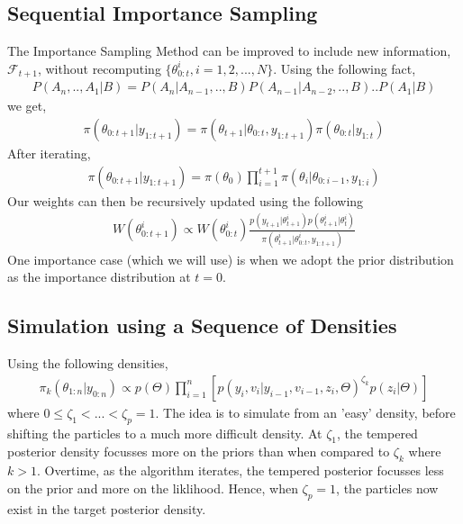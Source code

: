 \documentclass[11pt]{article}
\theoremstyle{definition}
\begin{document}
\subsection{Sequential Importance Sampling}
The Importance Sampling Method can be improved to include new information, $\mathcal{F}_{t+1}$, without recomputing $\{\theta_{0:t}^{i},i=1,2,...,N\}$. Using the following fact,
\begin{equation}
	\begin{aligned}
		P(A_{n},..,A_{1}|B) = P(A_{n}|A_{n-1},..,B)P(A_{n-1}|A_{n-2},..,B)..P(A_{1}|B)
	\end{aligned}
\end{equation}
we get,
\begin{equation}
	\begin{aligned}
		\pi(\theta_{0:t+1}|y_{1:t+1}) = \pi(\theta_{t+1}|\theta_{0:t},y_{1:t+1})\pi(\theta_{0:t}|y_{1:t})
	\end{aligned}
\end{equation}
After iterating,
\begin{equation}
	\begin{aligned}
		\pi(\theta_{0:t+1}|y_{1:t+1}) = \pi(\theta_{0})\prod_{i=1}^{t+1}\pi(\theta_{i}|\theta_{0:i-1},y_{1:i})
	\end{aligned}
\end{equation}
Our weights can then be recursively updated using the following
\begin{equation}
	\begin{aligned}
		W(\theta_{0:t+1}^{i}) \propto W(\theta_{0:t}^{i}) \frac{p(y_{t+1}|\theta_{t+1}^{i})p(\theta_{t+1}^{i}|\theta_{t}^{i})}{\pi(\theta_{t+1}^{i}|\theta_{0:t}^{i},y_{1:t+1})}
	\end{aligned}
\end{equation}
One importance case (which we will use) is when we adopt the prior distribution as the importance distribution at $t=0$. 
\subsection{Simulation using a Sequence of Densities}
Using the following densities,
\begin{equation}
	\begin{aligned}
		\pi_{k}(\theta_{1:n}|y_{0:n}) \propto p(\Theta)\prod_{i=1}^{n}[p(y_{i},v_{i}|y_{i-1},v_{i-1},z_{i},\Theta)^{\zeta_{k}}p(z_{i}|\Theta)] 
	\end{aligned}
\end{equation}
where $0\leqslant\zeta_{1}<...<\zeta_{p}=1.$ 
\noindent The idea is to simulate from an 'easy' density, before shifting the particles to a much more difficult density. At $\zeta_{1}$, the tempered posterior density focusses more on the priors than when compared to $\zeta_{k}$ where $k>1$. Overtime, as the algorithm iterates, the tempered posterior focusses less on the prior and more on the liklihood. Hence, when $\zeta_{p}=1$, the particles now exist in the target posterior density.
\end{document}
